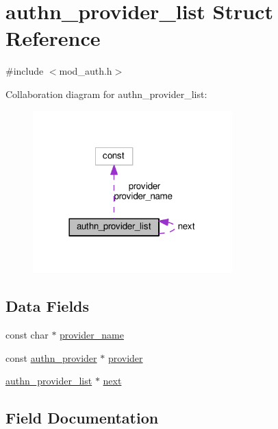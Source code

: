 \hypertarget{structauthn__provider__list}{}\section{authn\+\_\+provider\+\_\+list Struct Reference}
\label{structauthn__provider__list}


{\ttfamily \#include $<$mod\+\_\+auth.\+h$>$}



Collaboration diagram for authn\+\_\+provider\+\_\+list\+:
\nopagebreak
\begin{figure}[H]
\begin{center}
\leavevmode
\includegraphics[width=218pt]{structauthn__provider__list__coll__graph}
\end{center}
\end{figure}
\subsection*{Data Fields}
\begin{DoxyCompactItemize}
\item 
const char $\ast$ \hyperlink{structauthn__provider__list_af37d3481695dc0e80f5f2b237c2baea0}{provider\+\_\+name}
\item 
const \hyperlink{structauthn__provider}{authn\+\_\+provider} $\ast$ \hyperlink{structauthn__provider__list_aee01f382f2721f7f688e30395b4ead0b}{provider}
\item 
\hyperlink{structauthn__provider__list}{authn\+\_\+provider\+\_\+list} $\ast$ \hyperlink{structauthn__provider__list_a5c85b54f9ef6cd8f7697b6bdce0abfd8}{next}
\end{DoxyCompactItemize}


\subsection{Field Documentation}
